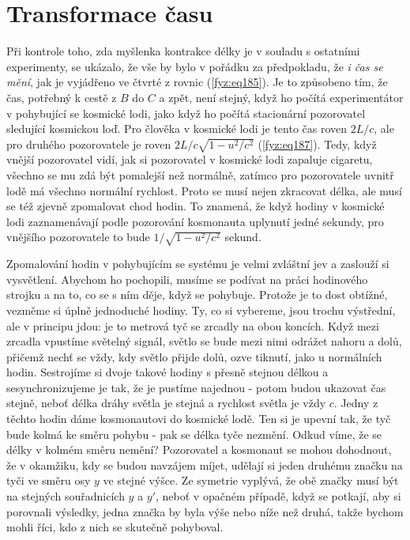   \section{Transformace času}\label{fyz:IchapXVsecVI}
    Při kontrole toho, zda myšlenka kontrakce délky je v souladu s ostatními experimenty, se 
    ukázalo, že vše by bylo v pořádku za předpokladu, že \emph{i čas se mění}, jak je vyjádřeno ve 
    čtvrté z rovnic (\ref{fyz:eq185}). Je to způsobeno tím, že čas, potřebný k cestě z \(B\) do 
    \(C\) a zpět, není stejný, když ho počítá experimentátor v pohybující se kosmické lodi, jako 
    když ho počítá stacionární pozorovatel sledující kosmickou loď. Pro člověka v kosmické lodi je 
    tento čas roven \(2L/c\), ale pro druhého pozorovatele je roven \(2L/c\sqrt{1 - u^2/c^2}\) 
    (\ref{fyz:eq187}). Tedy, když vnější pozorovatel vidí, jak si pozorovatel v kosmické lodi 
    zapaluje cigaretu, všechno se mu zdá být pomalejší než normálně, zatímco pro pozorovatele 
    uvnitř lodě má všechno normální rychlost. Proto se musí nejen zkracovat délka, ale musí se též 
    zjevně zpomalovat chod hodin. To znamená, že když hodiny v kosmické lodi zaznamenávají podle 
    pozorování kosmonauta uplynutí jedné sekundy, pro vnějšího pozorovatele to bude \(1/\sqrt{1 - 
    u^2/c^2}\) sekund.
    
    Zpomalování hodin v pohybujícím se systému je velmi zvláštní jev a zaslouží si vysvětlení. 
    Abychom ho pochopili, musíme se podívat na práci hodinového strojku a na to, co se s ním děje, 
    když se pohybuje. Protože je to dost obtížné, vezměme si úplně jednoduché hodiny. Ty, co si 
    vybereme, jsou trochu výstřední, ale v principu jdou: je to metrová tyč se zrcadly na obou 
    koncích. Když mezi zrcadla vpustíme světelný signál, světlo se bude mezi nimi odrážet nahoru a 
    dolů, přičemž nechť se vždy, kdy světlo přijde dolů, ozve tiknutí, jako u normálních hodin. 
    Sestrojíme si dvoje takové hodiny s přesně stejnou délkou a sesynchronizujeme je tak, že je 
    pustíme najednou - potom budou ukazovat čas stejně, neboť délka dráhy světla je stejná a 
    rychlost světla je vždy \(c\). Jedny z těchto hodin dáme kosmonautovi do kosmické lodě. Ten si 
    je upevní tak, že tyč bude kolmá ke směru pohybu - pak se délka tyče nezmění. Odkud víme, že se 
    délky v kolmém směru nemění? Pozorovatel a kosmonaut se mohou dohodnout, že v okamžiku, kdy se 
    budou navzájem míjet, udělají si jeden druhému značku na tyči ve směru osy \(y\) ve stejné 
    výšce. Ze symetrie vyplývá, že obě značky musí být na stejných souřadnicích \(y\) a \(y'\), 
    neboť v opačném případě, když se potkají, aby si porovnali výsledky, jedna značka by byla výše 
    nebo níže než druhá, takže bychom mohli říci, kdo z nich se skutečně pohyboval.
    
